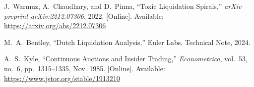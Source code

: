 \documentclass[11pt]{article}
\begin{document}
\bigskip
\begin{thebibliography}{99}

J.~Warmuz, A.~Chaudhary, and D.~Pinna, 
``Toxic Liquidation Spirals,'' 
\emph{arXiv preprint arXiv:2212.07306}, 2022. [Online]. Available: \url{https://arxiv.org/abs/2212.07306}

M.~A.~Bentley, 
``Dutch Liquidation Analysis,'' 
Euler Labs, Technical Note, 2024.

A.~S.~Kyle, 
``Continuous Auctions and Insider Trading,'' 
\emph{Econometrica}, vol.~53, no.~6, pp.~1315--1335, Nov. 1985. [Online]. Available: \url{https://www.jstor.org/stable/1913210}

\end{thebibliography}
\end{document}
